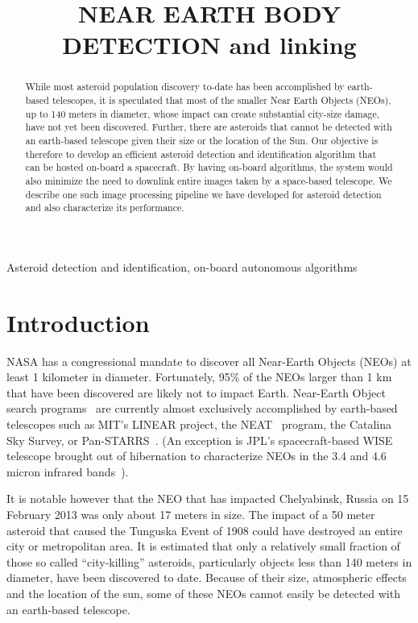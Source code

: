 \documentclass{article}
\title{NEAR EARTH BODY DETECTION and linking}
\begin{document}
%
\maketitle
%
\begin{abstract}
While most asteroid population discovery to-date has been accomplished  by earth-based telescopes, it is speculated that most of the smaller Near Earth Objects (NEOs), up to 140 meters in diameter, whose impact can create substantial city-size damage, have not yet been discovered.  Further, there are asteroids that cannot be detected with an earth-based telescope given their size or the location of the Sun.  Our objective is therefore to develop an efficient asteroid detection and identification algorithm that can be hosted on-board a spacecraft.  By having on-board algorithms, the system would also minimize the need to downlink entire images taken by a space-based telescope. We describe one such image processing pipeline we have developed for asteroid detection and also characterize its performance.
 
\end{abstract}
%
\begin{keywords}
Asteroid detection and identification, on-board autonomous algorithms 
\end{keywords}
%
\section{Introduction}
\label{sec:intro}

NASA has a congressional mandate to discover all Near-Earth Objects (NEOs) at least 1 kilometer in diameter.  Fortunately, 95\% of the NEOs larger than 1 km that have been discovered are likely not to impact Earth.  
Near-Earth Object search programs~\cite{stokes2002near} are currently almost exclusively accomplished by earth-based telescopes such as MIT's LINEAR \cite{evans2003detection}  project, the NEAT~\cite{neat2014} program, the Catalina Sky Survey, or  Pan-STARRS~\cite{denneau2013pan}.  (An exception is JPL's spacecraft-based WISE telescope brought out of hibernation to characterize NEOs in the 3.4 and 4.6 micron infrared bands~\cite{wise2014}). 

It is notable however that the NEO that has impacted Chelyabinsk, Russia on 15 February 2013 was only about 17 meters in size.  The impact of a 50 meter asteroid that caused the Tunguska Event of 1908 could have destroyed an entire city or metropolitan area. It is estimated that only a relatively small fraction of those so called ``city-killing'' asteroids, particularly objects less than 140 meters in diameter, have been discovered to date. Because of their size, atmospheric effects and the location of the sun, some of these NEOs cannot easily be detected with an earth-based telescope.  
\end{document}
